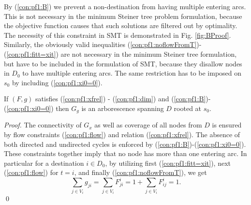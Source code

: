 By (\ref{con:pf1:B}) we prevent a non-destination from having multiple entering arcs.
This is not necessary in the minimum Steiner tree problem formulation, because the objective function causes that such solutions are filtered out by optimality.
The necessity of this constraint in SMT is demonstrated in Fig. \ref{fig:BProof}.
Similarly, the obviously valid inequalities (\ref{con:pf1:noflowFromT})-(\ref{con:pf1:fitt=xit}) are not necessary in the minimum Steiner tree formulation, but have to be included in the formulation of SMT, because they  disallow nodes in $D_0$ to have multiple entering arcs.
The same restriction has to be imposed on $s_0$ by including (\ref{con:pf1:xi0=0}).

\begin{prop}
\label{prop:modelcorrect}
If $(F,g)$ satisfies (\ref{con:pf1:xfrel}) - (\ref{con:pf1:dim}) and (\ref{con:pf1:B})-(\ref{con:pf1:xi0=0}) then $G_{g}$ is an arborescence spanning $D$ rooted at $s_0$.
\end{prop}
 
\begin{proof}
The connectivity of $G_{x}$ as well as coverage of all nodes from $D$ is ensured by flow constraints (\ref{con:pf1:flow}) and relation (\ref{con:pf1:xfrel}).
The absence of both directed and undirected cycles is enforced by (\ref{con:pf1:B})-(\ref{con:pf1:xi0=0}).
These constraints together imply that no node has more than one entering arc.
In particular for a destination $i\in D_0$, by utilizing first (\ref{con:pf1:fitt=xit}), next (\ref{con:pf1:flow}) for $t=i$, and finally (\ref{con:pf1:noflowFromT}), we get
$$\sum_{j\in V_i}g_{ji}=\sum_{j\in V_i}F_{ji}^i = 1+\sum_{j\in V_i}F_{ij}^i=1.$$
\qed
\end{proof}

